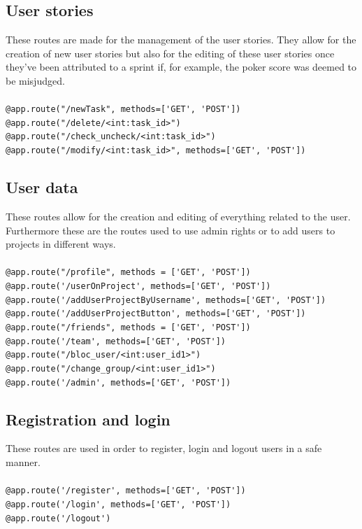 \documentclass{article}
\begin{document}
\subsection{User stories}
\noindent These routes are made for the management of the user stories. They allow for the creation of new user stories but also for the editing of these user stories once they've been attributed to a sprint if, for example, the poker score was deemed to be misjudged.\\\\
\verb|@app.route("/newTask", methods=['GET', 'POST']) |\\
\verb|@app.route("/delete/<int:task_id>")|\\
\verb|@app.route("/check_uncheck/<int:task_id>")|\\
\verb|@app.route("/modify/<int:task_id>", methods=['GET', 'POST'])|\\

\subsection{User data}
\noindent These routes allow for the creation and editing of everything related to the user.
Furthermore these are the routes used to use admin rights or to add users to projects in different ways.\\\\
\verb|@app.route("/profile", methods = ['GET', 'POST'])|\\
\verb|@app.route('/userOnProject', methods=['GET', 'POST'])|\\
\verb|@app.route('/addUserProjectByUsername', methods=['GET', 'POST'])|\\
\verb|@app.route('/addUserProjectButton', methods=['GET', 'POST'])|\\
\verb|@app.route("/friends", methods = ['GET', 'POST'])|\\
\verb|@app.route('/team', methods=['GET', 'POST'])|\\
\verb|@app.route("/bloc_user/<int:user_id1>")|\\
\verb|@app.route("/change_group/<int:user_id1>")|\\
\verb|@app.route('/admin', methods=['GET', 'POST'])|\\

\subsection{Registration and login}
\noindent These routes are used in order to register, login and logout users in a safe manner.\\\\
\verb|@app.route('/register', methods=['GET', 'POST'])|\\
\verb|@app.route('/login', methods=['GET', 'POST'])|\\
\verb|@app.route('/logout')|\\
\end{document}
